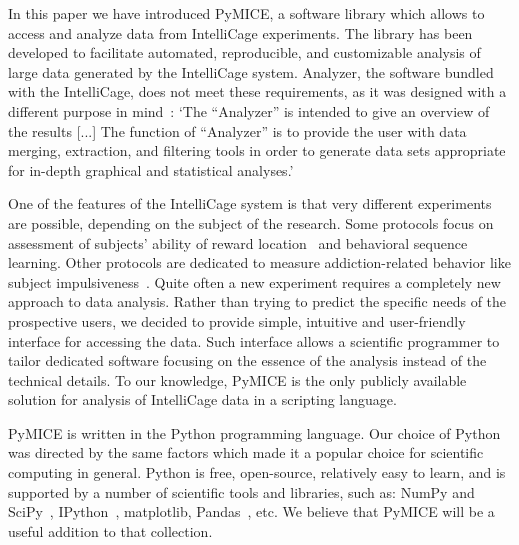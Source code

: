 In this paper we have introduced PyMICE, a software library which allows to access
and analyze data from IntelliCage experiments. 
%
The library has been developed to 
facilitate automated, reproducible, and customizable analysis of large data 
generated by the IntelliCage system. Analyzer, the software bundled with the 
IntelliCage, does not meet these requirements, as it was designed with a 
different purpose in mind~\cite{intelliCagePlusManual2011}:
`The ``Analyzer'' is intended to give an overview of the results [...]
The function of ``Analyzer'' is to provide the user with data merging,
extraction, and filtering tools in order to generate data sets appropriate for
in-depth graphical and statistical analyses.'

One of the features of the IntelliCage system is that very different
experiments are possible, depending on the subject of the research.
Some protocols focus on assessment of subjects' ability of reward
location~\cite{Knapska:2013dj} and behavioral sequence~\cite{Endo:2011bs}
learning. Other protocols are dedicated to measure addiction-related
behavior like subject impulsiveness~\cite{Radwanska:2012fd,Mijakowska:2015io}.
Quite often a new experiment requires a
completely new approach to data analysis. Rather than trying to predict the
specific needs of the prospective users, we decided to provide simple,
intuitive and user-friendly interface for accessing the data. Such interface
allows a scientific programmer to tailor dedicated software focusing on the
essence of the analysis instead of the technical details. To our knowledge,
PyMICE is the only publicly available solution for analysis of IntelliCage 
data in a scripting language.

PyMICE is written in the Python programming language. Our choice of Python 
was directed by the same factors
which made it a popular choice for scientific computing in general. 
Python is free,
open-source, relatively easy to learn, and is supported by a number of
scientific tools and libraries, such as: NumPy and SciPy~\cite{Oliphant:2007ud},
IPython~\cite{Perez:2007wf}, matplotlib,
Pandas~\cite{mckinney-proc-scipy-2010}, etc.
We believe that PyMICE will be a useful addition to that collection.

